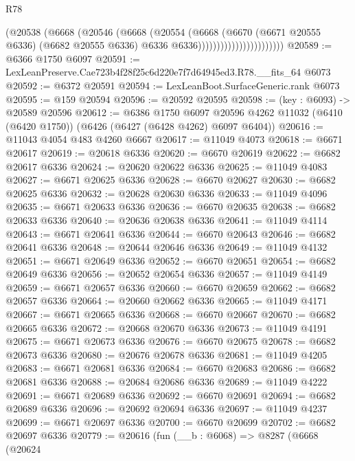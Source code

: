 \begin{lexlean}{R78}
\begin{coremodule}
                                    (@20538
                                      (@6668
                                        (@20546
                                          (@6668
                                            (@20554
                                              (@6668
                                                (@6670
                                                  (@6671 @20555 @6336)
                                                  (@6682 @20555 @6336)
                                                  @6336
                                                  @6336)))))))))))))))))))))))
@20589 := @6366 @1750 @6097
@20591 := LexLeanPreserve.Cae723b4f28f25c6d220e7f7d64945ed3.R78.__fits_64 @6073
@20592 := @6372 @20591
@20594 := LexLeanBoot.SurfaceGeneric.rank @6073
@20595 := @159 @20594
@20596 := @20592 @20595
@20598 := (key : @6093) -> @20589 @20596
@20612 := @6386
    @1750
    @6097
    @20596
    @4262
    @11032
    (@6410 (@6420 @1750))
    (@6426 (@6427 (@6428 @4262) @6097 @6404))
@20616 := @11043 @4054 @483 @4260 @6667
@20617 := @11049 @4073
@20618 := @6671 @20617
@20619 := @20618 @6336
@20620 := @6670 @20619
@20622 := @6682 @20617 @6336
@20624 := @20620 @20622 @6336
@20625 := @11049 @4083
@20627 := @6671 @20625 @6336
@20628 := @6670 @20627
@20630 := @6682 @20625 @6336
@20632 := @20628 @20630 @6336
@20633 := @11049 @4096
@20635 := @6671 @20633 @6336
@20636 := @6670 @20635
@20638 := @6682 @20633 @6336
@20640 := @20636 @20638 @6336
@20641 := @11049 @4114
@20643 := @6671 @20641 @6336
@20644 := @6670 @20643
@20646 := @6682 @20641 @6336
@20648 := @20644 @20646 @6336
@20649 := @11049 @4132
@20651 := @6671 @20649 @6336
@20652 := @6670 @20651
@20654 := @6682 @20649 @6336
@20656 := @20652 @20654 @6336
@20657 := @11049 @4149
@20659 := @6671 @20657 @6336
@20660 := @6670 @20659
@20662 := @6682 @20657 @6336
@20664 := @20660 @20662 @6336
@20665 := @11049 @4171
@20667 := @6671 @20665 @6336
@20668 := @6670 @20667
@20670 := @6682 @20665 @6336
@20672 := @20668 @20670 @6336
@20673 := @11049 @4191
@20675 := @6671 @20673 @6336
@20676 := @6670 @20675
@20678 := @6682 @20673 @6336
@20680 := @20676 @20678 @6336
@20681 := @11049 @4205
@20683 := @6671 @20681 @6336
@20684 := @6670 @20683
@20686 := @6682 @20681 @6336
@20688 := @20684 @20686 @6336
@20689 := @11049 @4222
@20691 := @6671 @20689 @6336
@20692 := @6670 @20691
@20694 := @6682 @20689 @6336
@20696 := @20692 @20694 @6336
@20697 := @11049 @4237
@20699 := @6671 @20697 @6336
@20700 := @6670 @20699
@20702 := @6682 @20697 @6336
@20779 := @20616
    (fun (__b : @6068) =>
    @8287
      (@6668
        (@20624

\end{coremodule}
\end{lexlean}
